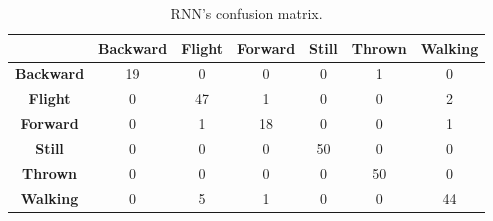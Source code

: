 \begin{table}[ht!]
	\centering
	\begin{tabular}{c|cccccc}
		\textbf{}         & \textbf{Backward} & \textbf{Flight} & \textbf{Forward} & \textbf{Still} & \textbf{Thrown} & \textbf{Walking} \\ \hline
		\textbf{Backward} & 19                & 0               & 0                & 0              & 1               & 0                \\
		\rowcolor[HTML]{EFEFEF} 
		\textbf{Flight}   & 0                 & 47              & 1                & 0              & 0               & 2                \\
		\textbf{Forward}  & 0                 & 1               & 18               & 0              & 0               & 1                \\
		\rowcolor[HTML]{EFEFEF} 
		\textbf{Still}    & 0                 & 0               & 0                & 50             & 0               & 0                \\
		\textbf{Thrown}   & 0                 & 0               & 0                & 0              & 50              & 0                \\
		\rowcolor[HTML]{EFEFEF} 
		\textbf{Walking}  & 0                 & 5               & 1                & 0              & 0               & 44              
	\end{tabular}
	\caption{RNN's confusion matrix.}
\end{table}

